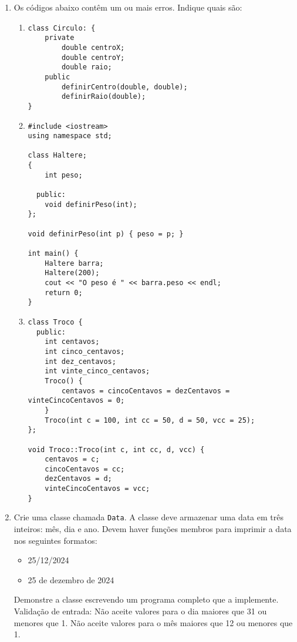 \documentclass[12pt]{article}
\begin{document}
\begin{enumerate}
  \item Os códigos abaixo contêm um ou mais erros. Indique quais são:
    \begin{enumerate}
      \item
        \begin{verbatim}
class Circulo: {
    private
        double centroX;
        double centroY;
        double raio;
    public
        definirCentro(double, double);
        definirRaio(double);
}
        \end{verbatim}

        \newpage
      \item
        \begin{verbatim}
#include <iostream>
using namespace std;

class Haltere;
{
    int peso;

  public:
    void definirPeso(int);
};

void definirPeso(int p) { peso = p; }

int main() {
    Haltere barra;
    Haltere(200);
    cout << "O peso é " << barra.peso << endl;
    return 0;
}
        \end{verbatim}
      \item
        \begin{verbatim}
class Troco {
  public:
    int centavos;
    int cinco_centavos;
    int dez_centavos;
    int vinte_cinco_centavos;
    Troco() {
        centavos = cincoCentavos = dezCentavos = vinteCincoCentavos = 0;
    }
    Troco(int c = 100, int cc = 50, d = 50, vcc = 25);
};

void Troco::Troco(int c, int cc, d, vcc) {
    centavos = c;
    cincoCentavos = cc;
    dezCentavos = d;
    vinteCincoCentavos = vcc;
}
        \end{verbatim}
    \end{enumerate}

  \item Crie uma classe chamada \texttt{Data}. A classe deve armazenar uma data em três inteiros: mês, dia e ano. Devem haver funções membros para imprimir a data nos seguintes formatos:
    \begin{itemize}
      \item 25/12/2024
      \item 25 de dezembro de 2024
    \end{itemize}
    Demonstre a classe escrevendo um programa completo que a implemente. Validação de entrada: Não aceite valores para o dia maiores que 31 ou menores que 1. Não aceite valores para o mês maiores que 12 ou menores que 1.


\end{enumerate}
\end{document}
